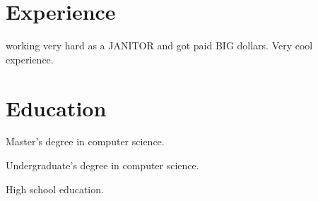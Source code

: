 \documentclass[paper=a4, fontsize=11pt]{resume}
\begin{document}


\section{Experience}

working very hard as a JANITOR and got paid BIG
dollars. Very cool experience.



\section{Education}

Master's degree in computer science.

Undergraduate's degree in computer science.

High school education.
\end{document}
